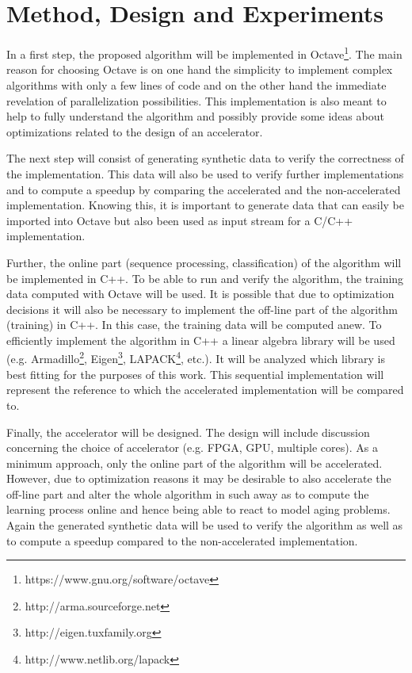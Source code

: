 \documentclass[12pt]{article} %
\begin{document}

\section{Method, Design and Experiments} %

In a first step, the proposed algorithm will be implemented in
Octave\footnote{https://www.gnu.org/software/octave}. The main reason for
choosing Octave is on one hand the simplicity to implement complex algorithms
with only a few lines of code and on the other hand the immediate revelation of
parallelization possibilities. This implementation is also meant to help to
fully understand the algorithm and possibly provide some ideas about
optimizations related to the design of an accelerator.

The next step will consist of generating synthetic data to verify the
correctness of the implementation. This data will also be used to verify
further implementations and to compute a speedup by comparing the accelerated
and the non-accelerated implementation. Knowing this, it is important to
generate data that can easily be imported into Octave but also been used as
input stream for a C/C++ implementation.

Further, the online part (sequence processing, classification) of the algorithm
will be implemented in C++. To be able to run and verify the algorithm, the
training data computed with Octave will be used. It is possible that due to
optimization decisions it will also be necessary to implement the off-line part
of the algorithm (training) in C++. In this case, the training data will be
computed anew. To efficiently implement the algorithm in C++ a linear algebra
library will be used (e.g. Armadillo\footnote{http://arma.sourceforge.net},
Eigen\footnote{http://eigen.tuxfamily.org},
LAPACK\footnote{http://www.netlib.org/lapack}, etc.).  It will be analyzed
which library is best fitting for the purposes of this work. This sequential
implementation will represent the reference to which the accelerated
implementation will be compared to.

Finally, the accelerator will be designed. The design will include discussion
concerning the choice of accelerator (e.g. FPGA, GPU, multiple cores). As
a minimum approach, only the online part of the algorithm will be accelerated.
However, due to optimization reasons it may be desirable to also accelerate the
off-line part and alter the whole algorithm in such away as to compute the
learning process online and hence being able to react to model aging problems.
Again the generated synthetic data will be used to verify the algorithm as well
as to compute a speedup compared to the non-accelerated implementation.
\end{document}
